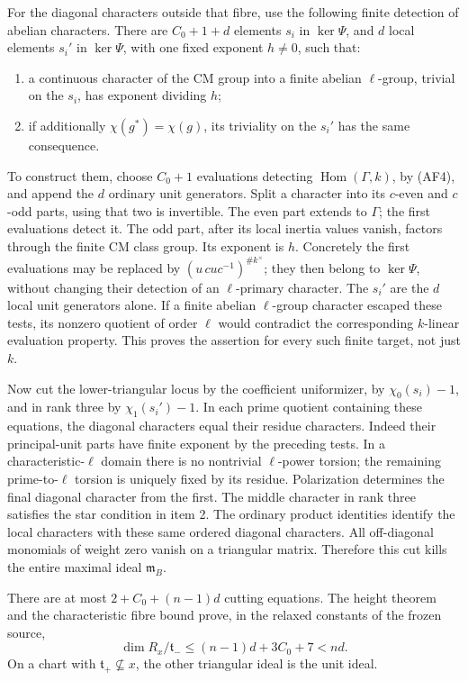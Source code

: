 For the diagonal characters outside that
fibre, use the following finite detection
of abelian characters.
There are \(C_0+1+d\) elements \(s_i\)
in \(\ker\Psi\), and \(d\) local elements
\(s_i'\) in \(\ker\Psi\), with one fixed
exponent \(h\ne0\), such that:
\begin{enumerate}
\item a continuous character of the CM group
into a finite abelian \(\ell\)-group,
trivial on the \(s_i\), has exponent dividing \(h\);
\item if additionally
\(\chi(g^*)=\chi(g)\), its triviality on
the \(s_i'\) has the same consequence.
\end{enumerate}
To construct them, choose \(C_0+1\)
evaluations detecting
\(\operatorname{Hom}(\Gamma,k)\), by (AF4),
and append the \(d\) ordinary unit generators.
Split a character into its \(c\)-even and
\(c\)-odd parts, using that two is invertible.
The even part extends to \(\Gamma\);
the first evaluations detect it.
The odd part, after its local inertia
values vanish, factors through the finite
CM class group.
Its exponent is \(h\).
Concretely the first evaluations may be
replaced by
\((u\,cuc^{-1})^{\#k^\times}\);
they then belong to \(\ker\Psi\), without
changing their detection of an
\(\ell\)-primary character.
The \(s_i'\) are the \(d\) local unit
generators alone.
If a finite abelian \(\ell\)-group character
escaped these tests, its nonzero quotient
of order \(\ell\) would contradict the
corresponding \(k\)-linear evaluation
property.
This proves the assertion for every such
finite target, not just \(k\).

Now cut the lower-triangular locus by
the coefficient uniformizer, by
\(\chi_0(s_i)-1\), and in rank three by
\(\chi_1(s_i')-1\).
In each prime quotient containing these
equations, the diagonal characters equal
their residue characters.
Indeed their principal-unit parts have
finite exponent by the preceding tests.
In a characteristic-\(\ell\) domain there
is no nontrivial \(\ell\)-power torsion;
the remaining prime-to-\(\ell\) torsion is
uniquely fixed by its residue.
Polarization determines the final
diagonal character from the first.
The middle character in rank three
satisfies the star condition in item 2.
The ordinary product identities identify
the local characters with these same
ordered diagonal characters.
All off-diagonal monomials of weight
zero vanish on a triangular matrix.
Therefore this cut kills the entire
maximal ideal \(\mathfrak m_B\).

There are at most
\(2+C_0+(n-1)d\) cutting equations.
The height theorem and the characteristic
fibre bound prove, in the relaxed
constants of the frozen source,
\[
     \dim R_x/\mathfrak t_-
                    \le(n-1)d+3C_0+7<nd .                   \tag{SH1}
\]
On a chart with
\(\mathfrak t_+\not\subseteq x\), the
other triangular ideal is the unit ideal.

